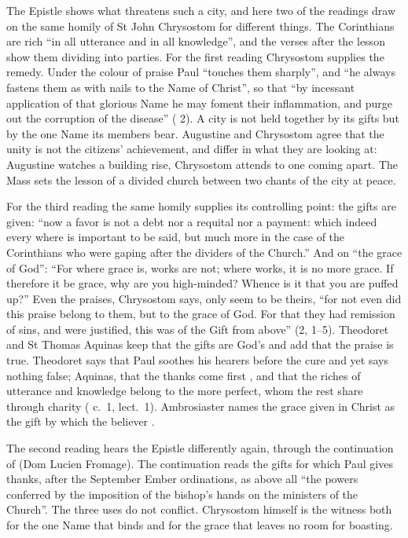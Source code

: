 The Epistle shows what threatens such a city, and here two of the readings
draw on the same homily of St John Chrysostom for different things. The Corinthians
are rich ``in all utterance and in all knowledge'', and the verses after the
lesson show them dividing into parties. For the first reading Chrysostom
supplies the remedy. Under the colour of praise Paul ``touches them sharply'',
and ``he always fastens them as with nails to the Name of Christ'', so that
``by incessant application of that glorious Name he may foment their
inflammation, and purge out the corruption of the disease'' ( 2). A city is not held together by its gifts but by the one
Name its members bear. Augustine and Chrysostom agree that the unity is not the
citizens' achievement, and differ in what they are looking at: Augustine
watches a building rise, Chrysostom attends to one coming apart. The Mass sets
the lesson of a divided church between two chants of the city at peace.

For the third reading the same homily supplies its controlling point: the gifts
are given: ``now a favor is not a debt nor a requital nor a payment: which indeed
every where is important to be said, but much more in the case of the
Corinthians who were gaping after the dividers of the Church.'' And on ``the
grace of God'': ``For where grace is, works are not; where works, it is no more
grace. If therefore it be grace, why are you high-minded? Whence is it that you
are puffed up?'' Even the praises, Chrysostom says, only seem to be theirs, ``for
not even did this praise belong to them, but to the grace of God. For that they
had remission of sins, and were justified, this was of the Gift from above''
(2, 1--5). Theodoret and St Thomas Aquinas keep that the gifts are God's and add
that the praise is true. Theodoret says that Paul soothes his hearers before the
cure and yet says nothing false; Aquinas, that the thanks come first , and that the riches of
utterance and knowledge belong to the more perfect, whom the rest share through
charity ( c.~1, lect.~1). Ambrosiaster names the
grace given in Christ as the gift by which the believer .

The second reading hears the Epistle differently again, through the continuation
of  (Dom Lucien Fromage). The continuation reads the
gifts for which Paul gives thanks, after the September Ember ordinations, as
above all ``the powers conferred by the imposition of the bishop's hands on the
ministers of the Church''. The three uses do not conflict. Chrysostom
himself is the witness both for the one Name that binds and for the grace that
leaves no room for boasting.

